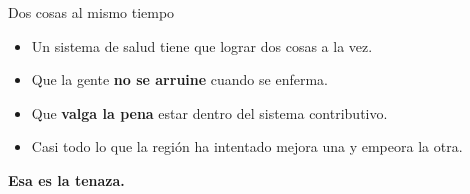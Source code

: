 \documentclass[aspectratio=169,11pt]{beamer}
\newcommand{\clave}[1]{\textcolor{acento}{\textbf{#1}}}
\newcommand{\destacar}[1]{%
  \vspace{0.5em}%
  \begin{center}%
    \colorbox{banda}{\parbox{0.92\textwidth}{\centering\vspace{0.3em}\textbf{#1}\vspace{0.3em}}}%
  \end{center}%
}
\begin{document}

\begin{frame}{Dos cosas al mismo tiempo}
  \begin{itemize}
    \item Un sistema de salud tiene que lograr dos cosas a la vez.
    \item Que la gente \clave{no se arruine} cuando se enferma.
    \item Que \clave{valga la pena} estar dentro del sistema contributivo.
    \item Casi todo lo que la región ha intentado mejora una y empeora la otra.
  \end{itemize}
  \destacar{Esa es la tenaza.}
\end{frame}
\end{document}
